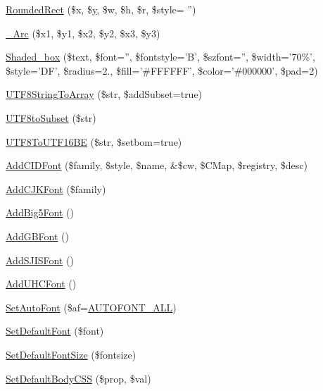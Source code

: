 \begin{DoxyCompactItemize}
\item 
\hyperlink{classm_p_d_f_a99110120a0868b595a70d51f6dee707b}{Rounded\-Rect} (\$x, \$\hyperlink{example43___m_p_d_f_i__booklet_8php_a3f83be162d14f38451e1bc419fbbbcbc}{y}, \$w, \$h, \$r, \$style= '')
\item 
\hyperlink{classm_p_d_f_acfadc8b763c60202f71da7af2b9dc2a7}{\-\_\-\-Arc} (\$x1, \$y1, \$x2, \$y2, \$x3, \$y3)
\item 
\hyperlink{classm_p_d_f_a1ebdfff343b0f5879e88348387383cf0}{Shaded\-\_\-box} (\$text, \$font='', \$fontstyle='B', \$szfont='', \$width='70\%', \$style='D\-F', \$radius=2., \$fill='\#F\-F\-F\-F\-F\-F', \$color='\#000000', \$pad=2)
\item 
\hyperlink{classm_p_d_f_a377a7b40f34fcec098bd76fffa514f1e}{U\-T\-F8\-String\-To\-Array} (\$str, \$add\-Subset=true)
\item 
\hyperlink{classm_p_d_f_a473d12d647e47af3335c751c20825468}{U\-T\-F8to\-Subset} (\$str)
\item 
\hyperlink{classm_p_d_f_a7f54f11f7d9d8b7d8c141987a4fa06e2}{U\-T\-F8\-To\-U\-T\-F16\-B\-E} (\$str, \$setbom=true)
\item 
\hyperlink{classm_p_d_f_aa56c18d485d8884746ba2896acc48306}{Add\-C\-I\-D\-Font} (\$family, \$style, \$name, \&\$cw, \$C\-Map, \$registry, \$desc)
\item 
\hyperlink{classm_p_d_f_a2447d1e2896abe978f3db3a255a79929}{Add\-C\-J\-K\-Font} (\$family)
\item 
\hyperlink{classm_p_d_f_ab6ff8bda4c5094cd5c5d8a7f99a98a94}{Add\-Big5\-Font} ()
\item 
\hyperlink{classm_p_d_f_a4cadc436a24ad7aa7e117e8da76da481}{Add\-G\-B\-Font} ()
\item 
\hyperlink{classm_p_d_f_ab65ee50d27101d9bce0ac185bb2823ca}{Add\-S\-J\-I\-S\-Font} ()
\item 
\hyperlink{classm_p_d_f_a6b7958d1a34389229492715adfb59952}{Add\-U\-H\-C\-Font} ()
\item 
\hyperlink{classm_p_d_f_a3516ea829dca56cbd794e7ab98852a47}{Set\-Auto\-Font} (\$af=\hyperlink{mpdf_8php_a7610702a00ad8f89228d9bcd7d2402e3}{A\-U\-T\-O\-F\-O\-N\-T\-\_\-\-A\-L\-L})
\item 
\hyperlink{classm_p_d_f_a5abc7f89d8536c23b986d946f6f3cdfe}{Set\-Default\-Font} (\$font)
\item 
\hyperlink{classm_p_d_f_a8d1a913fdb56087f360ccf4070da7b14}{Set\-Default\-Font\-Size} (\$fontsize)
\item 
\hyperlink{classm_p_d_f_a7604a8b391f30f70a3a479f09817f0fb}{Set\-Default\-Body\-C\-S\-S} (\$prop, \$val)

\end{DoxyCompactItemize}
